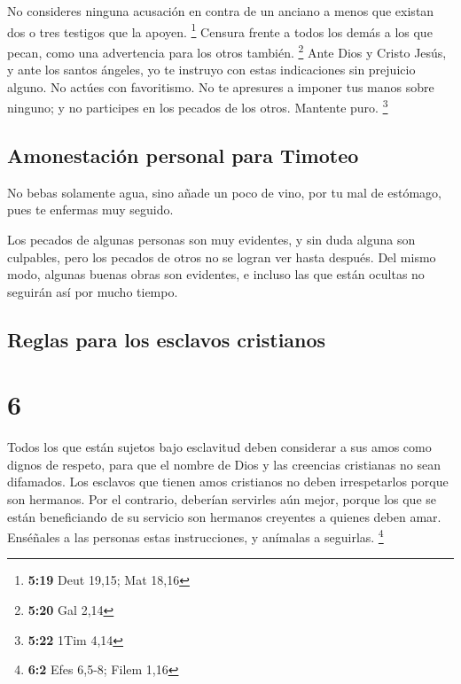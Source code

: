  No consideres ninguna acusación en contra de un anciano
a menos que existan dos o tres testigos que la apoyen. \footnote{\textbf{5:19}
  Deut 19,15; Mat 18,16}  Censura frente a todos los
demás a los que pecan, como una advertencia para los otros también.
\footnote{\textbf{5:20} Gal 2,14}  Ante Dios y Cristo
Jesús, y ante los santos ángeles, yo te instruyo con estas indicaciones
sin prejuicio alguno. No actúes con favoritismo.  No te
apresures a imponer tus manos sobre ninguno; y no participes en los
pecados de los otros. Mantente puro. \footnote{\textbf{5:22} 1Tim 4,14}

\hypertarget{amonestaciuxf3n-personal-para-timoteo}{%
\subsection{Amonestación personal para
Timoteo}\label{amonestaciuxf3n-personal-para-timoteo}}

 No bebas solamente agua, sino añade un poco de vino, por
tu mal de estómago, pues te enfermas muy seguido.

 Los pecados de algunas personas son muy evidentes, y sin
duda alguna son culpables, pero los pecados de otros no se logran ver
hasta después.  Del mismo modo, algunas buenas obras son
evidentes, e incluso las que están ocultas no seguirán así por mucho
tiempo.

\hypertarget{reglas-para-los-esclavos-cristianos}{%
\subsection{Reglas para los esclavos
cristianos}\label{reglas-para-los-esclavos-cristianos}}

\hypertarget{section-5}{%
\section{6}\label{section-5}}

 Todos los que están sujetos bajo esclavitud deben
considerar a sus amos como dignos de respeto, para que el nombre de Dios
y las creencias cristianas no sean difamados.  Los
esclavos que tienen amos cristianos no deben irrespetarlos porque son
hermanos. Por el contrario, deberían servirles aún mejor, porque los que
se están beneficiando de su servicio son hermanos creyentes a quienes
deben amar. Enséñales a las personas estas instrucciones, y anímalas a
seguirlas. \footnote{\textbf{6:2} Efes 6,5-8; Filem 1,16}

